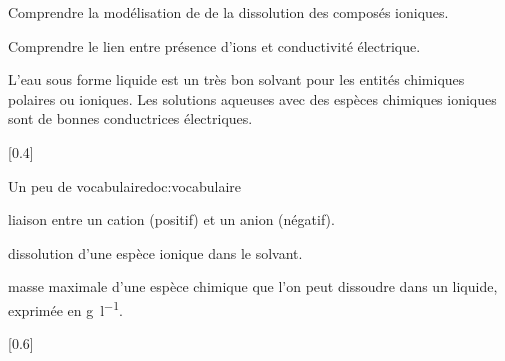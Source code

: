 \teteTermStssEnvi
\vspace*{-36pt}

\begin{objectifs}
  \item Comprendre la modélisation de de la dissolution des composés ioniques.
  \item Comprendre le lien entre présence d'ions et conductivité électrique.
\end{objectifs}

\begin{contexte}
  L'eau sous forme liquide est un très bon solvant pour les entités chimiques polaires ou ioniques.
  Les solutions aqueuses avec des espèces chimiques ioniques sont de bonnes conductrices électriques.
  
\end{contexte}


[0.4]{
  \begin{doc}{Un peu de vocabulaire}{doc:vocabulaire}
    \begin{importants}
      \pointCyan {}
      liaison entre un cation (positif) et un anion (négatif).
      
      \pointCyan {}
      dissolution d'une espèce ionique dans le solvant.
      
      \pointCyan {}
      masse maximale d'une espèce chimique que l'on peut dissoudre dans un liquide, exprimée en \unit{\g\per\litre}.
    \end{importants}
  \end{doc}
}[0.6]

